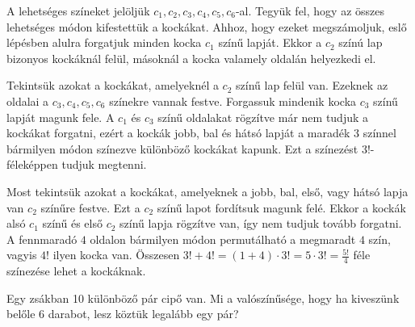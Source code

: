 \begin{solution}
A lehetséges színeket jelöljük $c_{1},c_{2},c_{3},c_{4},c_{5},c_{6}$-al.
Tegyük fel, hogy az összes lehetséges módon kifestettük a kockákat.
Ahhoz, hogy ezeket megszámoljuk, eslő lépésben alulra forgatjuk minden
kocka $c_{1}$ színű lapját. Ekkor a $c_{2}$ színú lap bizonyos kockáknál
felül, másoknál a kocka valamely oldalán helyezkedi el.

Tekintsük azokat a kockákat, amelyeknél a $c_{2}$ színű lap felül
van. Ezeknek az oldalai a $c_{3},c_{4},c_{5},c_{6}$ színekre vannak
festve. Forgassuk mindenik kocka $c_{3}$ színű lapját magunk fele.
A $c_{1}$ és $c_{3}$ színű oldalakat rögzítve már nem tudjuk a kockákat
forgatni, ezért a kockák jobb, bal és hátsó lapját a maradék $3$
színnel bármilyen módon színezve különböző kockákat kapunk. Ezt a
színezést $3!$-féleképpen tudjuk megtenni.

Most tekintsük azokat a kockákat, amelyeknek a jobb, bal, első, vagy
hátsó lapja van $c_{2}$ színűre festve. Ezt a $c_{2}$ színű lapot
fordítsuk magunk felé. Ekkor a kockák alsó $c_{1}$ színű és első
$c_{2}$ színű lapja rögzítve van, így nem tudjuk tovább forgatni.
A fennmaradó $4$ oldalon bármilyen módon permutálható a megmaradt
$4$ szín, vagyis $4!$ ilyen kocka van. Összesen $3!+4!=(1+4)\cdot3!=5\cdot3!=\frac{5!}{4}$
féle színezése lehet a kockáknak. 
\end{solution}
\begin{extraproblem}
Egy zsákban 10 különböző pár cipő van. Mi a valószínűsége, hogy ha
kiveszünk belőle 6 darabot, lesz köztük legalább egy pár? 
\end{extraproblem}

